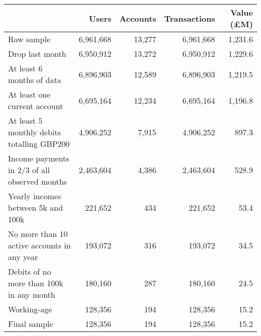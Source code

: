 \begin{tabular}{lrrrr}
\toprule
                                              &     Users & Accounts & Transactions & Value (\pounds M) \\
\midrule
                                   Raw sample & 6,961,668 &   13,277 &    6,961,668 &           1,231.6 \\
                              Drop last month & 6,950,912 &   13,272 &    6,950,912 &           1,229.6 \\
                    At least 6 months of data & 6,896,903 &   12,589 &    6,896,903 &           1,219.5 \\
                 At least one current account & 6,695,164 &   12,234 &    6,695,164 &           1,196.8 \\
   At least 5 monthly debits totalling GBP200 & 4,906,252 &    7,915 &    4,906,252 &             897.3 \\
Income payments in 2/3 of all observed months & 2,463,604 &    4,386 &    2,463,604 &             528.9 \\
           Yearly incomes between 5k and 100k &   221,652 &      434 &      221,652 &              53.4 \\
  No more than 10 active accounts in any year &   193,072 &      316 &      193,072 &              34.5 \\
     Debits of no more than 100k in any month &   180,160 &      287 &      180,160 &              24.5 \\
                                  Working-age &   128,356 &      194 &      128,356 &              15.2 \\
                                 Final sample &   128,356 &      194 &      128,356 &              15.2 \\
\bottomrule
\end{tabular}
